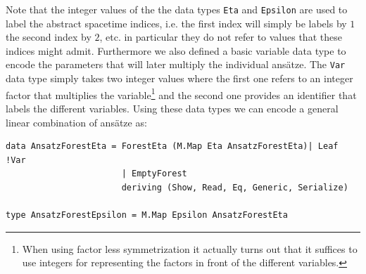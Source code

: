 \documentclass[a4paper,12pt, DIV=14, BCOR=5mm, twoside, headsepline]{scrbook}
\begin{document}
Note that the integer values of the the data types \texttt{Eta} and \texttt{Epsilon} are used to label the abstract spacetime indices, i.e. the first index will simply be labels by $1$ the second index by $2$, etc. in particular they do not refer to values that these indices might admit. Furthermore we also defined a basic variable data type to encode the parameters that will later multiply the individual ansätze. The \texttt{Var}
data type simply takes two integer values where the first one refers to an integer factor that multiplies the variable\footnote{When using factor less symmetrization it actually turns out that it suffices to use integers for representing the factors in front of the different variables.} and the second one provides an identifier that labels the different variables. 
Using these data types we can encode a general linear combination of ansätze as:

\begin{samepage} 
\begin{verbatim}
data AnsatzForestEta = ForestEta (M.Map Eta AnsatzForestEta)| Leaf !Var
                       | EmptyForest 
                       deriving (Show, Read, Eq, Generic, Serialize)

type AnsatzForestEpsilon = M.Map Epsilon AnsatzForestEta
\end{verbatim} 
\end{samepage}
\end{document}
